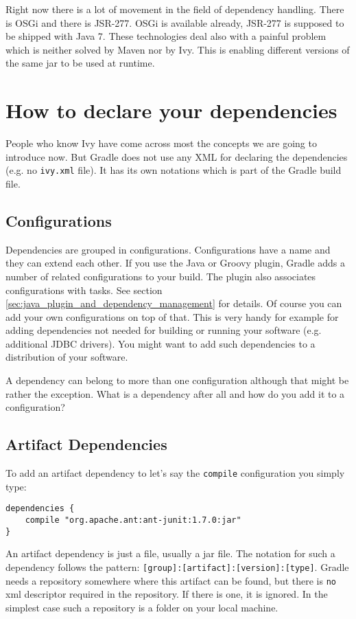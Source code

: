 Right now there is a lot of movement in the field of dependency handling. There is OSGi and there is JSR-277. OSGi is available already, JSR-277 is supposed to be shipped with Java 7. These technologies deal also with a painful problem which is neither solved by Maven nor by Ivy. This is enabling different versions of the same jar to be used at runtime.

\section{How to declare your dependencies} %
\label{sec:how_to_declare_your_dependencies}
People who know Ivy have come across most the concepts we are going to introduce now. But Gradle does not use any XML for declaring the dependencies (e.g. no \texttt{ivy.xml} file). It has its own notations which is part of the Gradle build file.

\subsection{Configurations} %
\label{sub:configurations}
Dependencies are grouped in configurations. Configurations have a name and they can extend each other. If you use the Java or Groovy plugin, Gradle adds a number of related configurations to your build. The plugin also associates configurations with tasks. See section \ref{sec:java_plugin_and_dependency_management} for details. Of course you can add your own configurations on top of that. This is very handy for example for adding dependencies not needed for building or running your software (e.g. additional JDBC drivers). You might want to add such dependencies to a distribution of your software.

A dependency can belong to more than one configuration although that might be rather the exception. What is a dependency after all and how do you add it to a configuration?

\subsection{Artifact Dependencies} %
\label{sub:artifact_dependencies}
To add an artifact dependency to let's say the \texttt{compile} configuration you simply type:
\begin{Verbatim}
dependencies {
	compile "org.apache.ant:ant-junit:1.7.0:jar"
}
\end{Verbatim}
An artifact dependency is just a file, usually a jar file. The notation for such a dependency follows the  pattern: \texttt{[group]:[artifact]:[version]:[type]}. Gradle needs a repository somewhere where this artifact can be found, but there is \texttt{no} xml descriptor required in the repository. If there is one, it is ignored. In the simplest case such a repository is a folder on your local machine.

